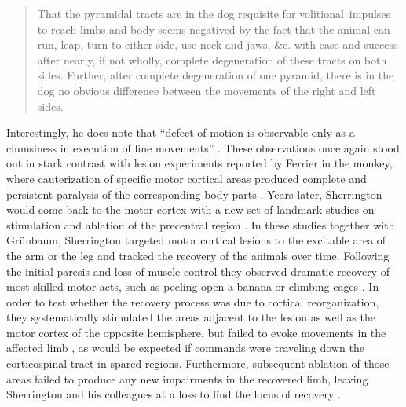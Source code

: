 \blockquote[{\protect\cite[p.189]{Sherrington1885}}]{That the pyramidal tracts are in the dog requisite for volitional~impulses to reach limbs and body seems negatived by the fact that the animal can run, leap, turn to either side, use neck and jaws, \&c. with ease and success after nearly, if not wholly, complete degeneration of these tracts on both sides. Further, after complete degeneration of one pyramid, there is in the dog no obvious difference between the movements of the right and left sides.}

Interestingly, he does note that \enquote{defect of motion is observable only as a clumsiness in execution of fine movements} \cite{Sherrington1885}. These observations once again stood out in stark contrast with lesion experiments reported by Ferrier in the monkey, where cauterization of specific motor cortical areas produced complete and persistent paralysis of the corresponding body parts \cite{Ferrier1884}. Years later, Sherrington would come back to the motor cortex with a new set of landmark studies on stimulation and ablation of the precentral region \cite{Grunbaum1903,GrahamBrown1913,Leyton1917}. In these studies together with Gr\"unbaum, Sherrington targeted motor cortical lesions to the excitable area of the arm or the leg and tracked the recovery of the animals over time. Following the initial paresis and loss of muscle control they observed dramatic recovery of most skilled motor acts, such as peeling open a banana or climbing cages \cite{Leyton1917}. In order to test whether the recovery process was due to cortical reorganization, they systematically stimulated the areas adjacent to the lesion as well as the motor cortex of the opposite hemisphere, but failed to evoke movements in the affected limb \cite{Leyton1917}, as would be expected if commands were traveling down the corticospinal tract in spared regions. Furthermore, subsequent ablation of those areas failed to produce any new impairments in the recovered limb, leaving Sherrington and his colleagues at a loss to find the locus of recovery \cite{Leyton1917}.

